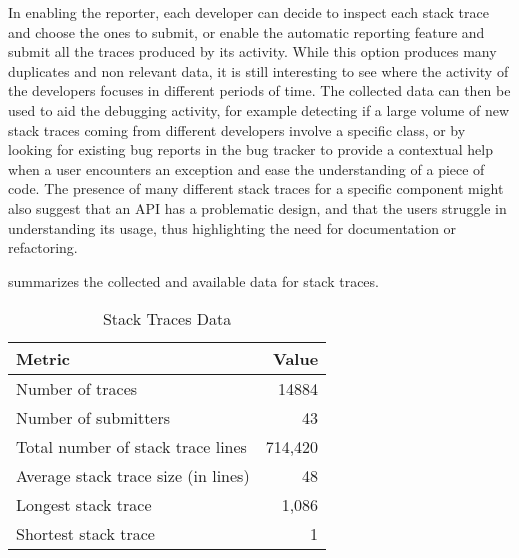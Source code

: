 In enabling the reporter, each developer can decide to inspect each stack trace and choose the ones to submit, or enable the automatic reporting feature and submit all the traces produced by its activity.
While this option produces many duplicates and non relevant data, it is still interesting to see where the activity of the developers focuses in different periods of time.
The collected data can then be used to aid the debugging activity, for example detecting if a large volume of new stack traces coming from different developers involve a specific class, or by looking for existing bug reports in the bug tracker to provide a contextual help when a user encounters an exception and ease the understanding of a piece of code.
The presence of many different stack traces for a specific component might also suggest that an API has a problematic design, and that the users struggle in understanding its usage, thus highlighting the need for documentation or refactoring.

 summarizes the collected and available data for stack traces.

\begin{table}[ht]\small
\centering
\caption{Stack Traces Data}
\label{tab:stacktraces}
\begin{tabular}{lr}

  \rowcolor{tableheader} \textbf{Metric} & \textbf{Value} \\ \hline Number of traces & 14884 \\
  Number of submitters & 43 \\
  Total number of stack trace lines & 714,420 \\
  Average stack trace size (in lines) & 48 \\
  Longest stack trace & 1,086 \\
  Shortest stack trace & 1 \\
  \hline
\end{tabular}
\end{table}

%



